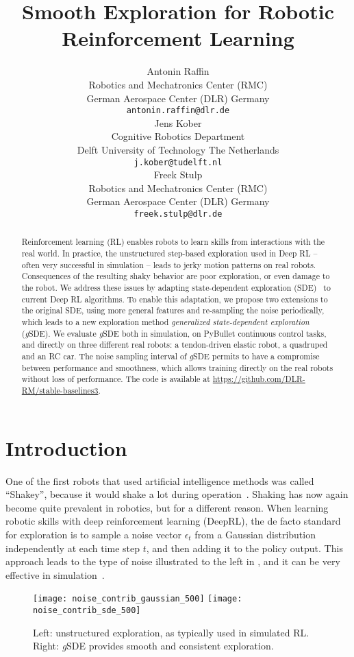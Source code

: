 \documentclass{article}
\title{Smooth Exploration for Robotic Reinforcement Learning}
\author{
  Antonin Raffin\\
  Robotics and Mechatronics Center (RMC)\\
  German Aerospace Center (DLR)
  Germany\\
  \texttt{antonin.raffin@dlr.de} \\
  \And
  Jens Kober\\
  Cognitive Robotics Department\\
  Delft University of Technology
  The Netherlands\\
  \texttt{j.kober@tudelft.nl} \\
  \And
  Freek Stulp\\
  Robotics and Mechatronics Center (RMC)\\
  German Aerospace Center (DLR)
  Germany\\
  \texttt{freek.stulp@dlr.de} \\
}
\newcommand{\noise}{\epsilon}
\newcommand{\ourSDE}{\textit{g}\textsc{SDE}\xspace}
\begin{document}
\maketitle


\begin{abstract}

Reinforcement learning (RL) enables robots to learn skills from interactions with the real world.
In practice, the unstructured step-based exploration used in Deep RL -- often very successful in simulation -- leads to jerky motion patterns on real robots.
Consequences of the resulting shaky behavior are poor exploration, or even damage to the robot.
We address these issues by adapting state-dependent exploration (SDE)~\citep{ruckstiess2008state} to current Deep RL algorithms.
To enable this adaptation, we propose two extensions to the original SDE, using more general features and re-sampling the noise periodically, which leads to a new exploration method \textit{generalized state-dependent exploration} (\ourSDE).
We evaluate \ourSDE both in simulation, on PyBullet continuous control tasks, and directly on three different real robots: a tendon-driven elastic robot, a quadruped and an RC car.
The noise sampling interval of \ourSDE permits to have a compromise between performance and smoothness, which allows training directly on the real robots without loss of performance.
The code is available at \url{https://github.com/DLR-RM/stable-baselines3}.
\end{abstract}



\section{Introduction}
\label{sec:intro}

One of the first robots that used artificial intelligence methods was called ``Shakey'', because it would shake a lot during operation~\citep{nilsson84shakey}.
Shaking has now again become quite prevalent in robotics, but for a different reason. When learning robotic skills with deep reinforcement learning (DeepRL), the de facto standard for exploration is to sample a noise vector $\noise_t$ from a Gaussian distribution independently at each time step $t$, and then adding it to the policy output.
This approach leads to the type of noise illustrated to the left in , and it can be very effective
in simulation~\citep{duan2016benchmarking, andrychowicz2018learning, fujimoto2018addressing, peng2018deepmimic, hwangbo2019learning}.
\begin{figure}[htb]
  \centering
  \texttt{[image: noise\_contrib\_gaussian\_500]}
  \hfill
  \texttt{[image: noise\_contrib\_sde\_500]}
  \caption{\label{fig:exploration_comparison} Left: unstructured exploration, as typically used in simulated RL. Right: \ourSDE provides smooth and consistent exploration.}
\end{figure}
\end{document}

